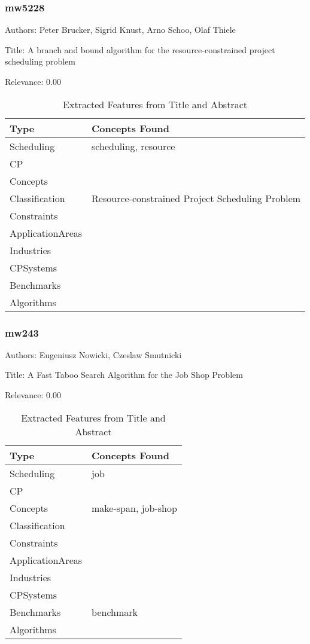 \subsubsection{mw5228}
\label{mw:mw5228}

Authors: Peter Brucker, Sigrid Knust, Arno Schoo, Olaf Thiele

Title: A branch and bound algorithm for the resource-constrained project scheduling problem

Relevance:  0.00

{\scriptsize
\begin{longtable}{p{2cm}p{20cm}}
\caption{Extracted Features from Title and Abstract}\\ \toprule
Type & Concepts Found\\ \midrule
\endhead
\bottomrule
\endfoot
Scheduling & scheduling, resource\\ 
CP & \\ 
Concepts & \\ 
Classification & Resource-constrained Project Scheduling Problem\\ 
Constraints & \\ 
ApplicationAreas & \\ 
Industries & \\ 
CPSystems & \\ 
Benchmarks & \\ 
Algorithms & \\ 
\end{longtable}
}



\subsubsection{mw243}
\label{mw:mw243}

Authors: Eugeniusz Nowicki, Czeslaw Smutnicki

Title: A Fast Taboo Search Algorithm for the Job Shop Problem

Relevance:  0.00

{\scriptsize
\begin{longtable}{p{2cm}p{20cm}}
\caption{Extracted Features from Title and Abstract}\\ \toprule
Type & Concepts Found\\ \midrule
\endhead
\bottomrule
\endfoot
Scheduling & job\\ 
CP & \\ 
Concepts & make-span, job-shop\\ 
Classification & \\ 
Constraints & \\ 
ApplicationAreas & \\ 
Industries & \\ 
CPSystems & \\ 
Benchmarks & benchmark\\ 
Algorithms & \\ 
\end{longtable}
}

